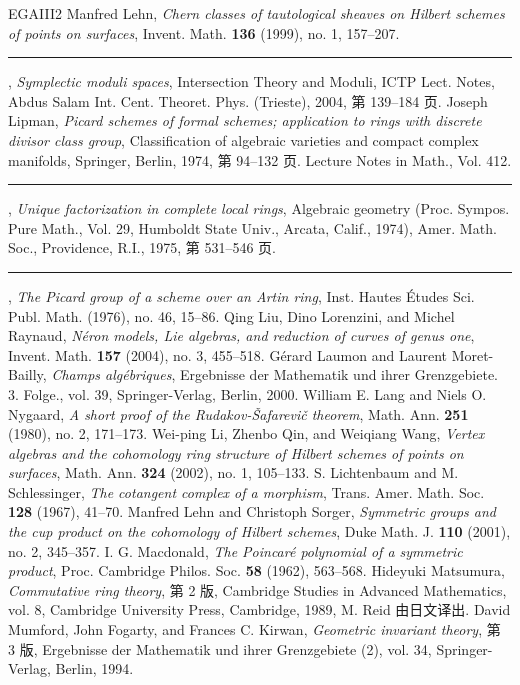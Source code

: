 \begin{thebibliography}{EGAIII2}
 Manfred Lehn, \emph{Chern classes of tautological sheaves on Hilbert schemes of points on surfaces}, Invent. Math. \textbf{136} (1999), no. 1, 157--207.
 \rule{2em}{.3pt}, \emph{Symplectic moduli spaces}, Intersection Theory and Moduli, ICTP Lect. Notes, Abdus Salam Int. Cent. Theoret. Phys. (Trieste), 2004, 第 139--184 页.
 Joseph Lipman, \emph{Picard schemes of formal schemes; application to rings with discrete divisor class group}, Classification of algebraic varieties and compact complex manifolds, Springer, Berlin, 1974, 第 94--132 页. Lecture Notes in Math., Vol. 412.
 \rule{2em}{.3pt}, \emph{Unique factorization in complete local rings}, Algebraic geometry (Proc. Sympos. Pure Math., Vol. 29, Humboldt State Univ., Arcata, Calif., 1974), Amer. Math. Soc., Providence, R.I., 1975, 第 531--546 页.
 \rule{2em}{.3pt}, \emph{The Picard group of a scheme over an Artin ring}, Inst. Hautes Études Sci. Publ. Math. (1976), no. 46, 15--86.
 Qing Liu, Dino Lorenzini, and Michel Raynaud, \emph{Néron models, Lie algebras, and reduction of curves of genus one}, Invent. Math. \textbf{157} (2004), no. 3, 455--518.
 Gérard Laumon and Laurent Moret-Bailly, \emph{Champs algébriques}, Ergebnisse der Mathematik und ihrer Grenzgebiete. 3. Folge., vol. 39, Springer-Verlag, Berlin, 2000.
 William E. Lang and Niels O. Nygaard, \emph{A short proof of the Rudakov-Šafarevič theorem}, Math. Ann. \textbf{251} (1980), no. 2, 171--173.
 Wei-ping Li, Zhenbo Qin, and Weiqiang Wang, \emph{Vertex algebras and the cohomology ring structure of Hilbert schemes of points on surfaces}, Math. Ann. \textbf{324} (2002), no. 1, 105--133.
 S. Lichtenbaum and M. Schlessinger, \emph{The cotangent complex of a morphism}, Trans. Amer. Math. Soc. \textbf{128} (1967), 41--70.
 Manfred Lehn and Christoph Sorger, \emph{Symmetric groups and the cup product on the cohomology of Hilbert schemes}, Duke Math. J. \textbf{110} (2001), no. 2, 345--357.
 I. G. Macdonald, \emph{The Poincaré polynomial of a symmetric product}, Proc. Cambridge Philos. Soc. \textbf{58} (1962), 563--568.
 Hideyuki Matsumura, \emph{Commutative ring theory}, 第 2 版, Cambridge Studies in Advanced Mathematics, vol. 8, Cambridge University Press, Cambridge, 1989, M. Reid 由日文译出.
 David Mumford, John Fogarty, and Frances C. Kirwan, \emph{Geometric invariant theory}, 第 3 版, Ergebnisse der Mathematik und ihrer Grenzgebiete (2), vol. 34, Springer-Verlag, Berlin, 1994.

\end{thebibliography}
